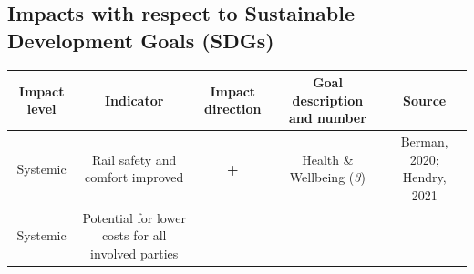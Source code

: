 \documentclass[
]{book}
\begin{document}
\hypertarget{impacts-with-respect-to-sustainable-development-goals-sdgs-21}{%
\subsection*{Impacts with respect to Sustainable Development Goals (SDGs)}\label{impacts-with-respect-to-sustainable-development-goals-sdgs-21}}

\begin{longtable}[]{@{}ccccc@{}}
\toprule
\begin{minipage}[b]{0.17\columnwidth}\centering
Impact level\strut
\end{minipage} & \begin{minipage}[b]{0.16\columnwidth}\centering
Indicator\strut
\end{minipage} & \begin{minipage}[b]{0.17\columnwidth}\centering
Impact direction\strut
\end{minipage} & \begin{minipage}[b]{0.17\columnwidth}\centering
Goal description and number\strut
\end{minipage} & \begin{minipage}[b]{0.17\columnwidth}\centering
Source\strut
\end{minipage}\tabularnewline
\midrule
\endhead
\begin{minipage}[t]{0.17\columnwidth}\centering
Systemic\strut
\end{minipage} & \begin{minipage}[t]{0.16\columnwidth}\centering
Rail safety and comfort improved\strut
\end{minipage} & \begin{minipage}[t]{0.17\columnwidth}\centering
\textbf{+}\strut
\end{minipage} & \begin{minipage}[t]{0.17\columnwidth}\centering
Health \& Wellbeing (\emph{3})\strut
\end{minipage} & \begin{minipage}[t]{0.17\columnwidth}\centering
Berman, 2020; Hendry, 2021\strut
\end{minipage}\tabularnewline
\begin{minipage}[t]{0.17\columnwidth}\centering
Systemic\strut
\end{minipage} & \begin{minipage}[t]{0.16\columnwidth}\centering
Potential for lower costs for all involved parties\strut

\end{minipage}
\end{longtable}
\end{document}
